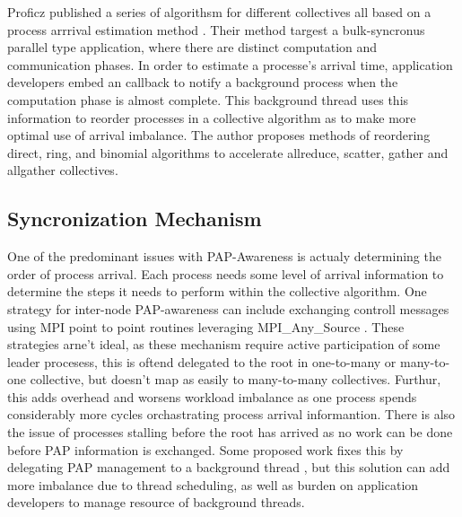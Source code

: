 Proficz published a series of algorithsm for different collectives all based on a process arrrival estimation method \cite{Proficz2018ImprvAllReduceForImbPAP, Proficz2020PAPAwareScatterGather, Proficz2021AllGatherResilientToImbPAP}.
Their method targest a bulk-syncronus parallel type application, where there are distinct computation and communication phases.
In order to estimate a processe's arrival time, application developers embed an callback to notify a background process when the computation phase is almost complete.
This background thread uses this information to reorder processes in a collective algorithm as to make more optimal use of arrival imbalance.
The author proposes methods of reordering direct, ring, and binomial algorithms to accelerate allreduce, scatter, gather and allgather collectives.


\subsection{Syncronization Mechanism}

One of the predominant issues with PAP-Awareness is actualy determining the order of process arrival.
Each process needs some level of arrival information to determine the steps it needs to perform within the collective algorithm. 
One strategy for inter-node PAP-awareness can include exchanging controll messages using MPI point to point routines leveraging MPI\_Any\_Source \cite{Patarasuk2008EffBcastDifProcArr}.
These strategies arne't ideal, as these mechanism require active participation of some leader procesess, this is oftend delegated to the root in one-to-many or many-to-one collective, but doesn't map as easily to many-to-many collectives.
Furthur, this adds overhead and worsens workload imbalance as one process spends considerably more cycles orchastrating process arrival informantion.
There is also the issue of processes stalling before the root has arrived as no work can be done before PAP information is exchanged.
Some proposed work fixes this by delegating PAP management to a background thread \cite{Proficz2018ImprvAllReduceForImbPAP, Proficz2020PAPAwareScatterGather, Proficz2021AllGatherResilientToImbPAP, Faraj2008StudyProcArrivalMPIColl}, but this solution can add more imbalance due to thread scheduling, as well as burden on application developers to manage resource of background threads.

